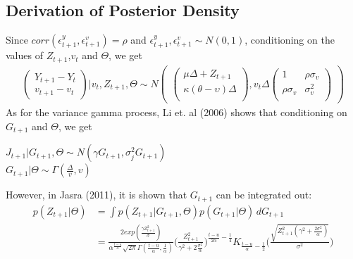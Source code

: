 \documentclass[12pt]{article}
\theoremstyle{definition}
\begin{document}
\subsection{Derivation of Posterior Density}
Since $corr(\epsilon_{t+1}^{y},\epsilon_{t+1}^{v})=\rho$ and $\epsilon_{t+1}^{y},\epsilon_{t+1}^{v} \sim N(0,1)$, conditioning on the values of $Z_{t+1}$,$v_{t}$ and $\Theta$, we get
\begin{equation}
	\begin{aligned}
\begin{pmatrix}
Y_{t+1} - Y_{t}\\
v_{t+1} - v_{t}
\end{pmatrix} | v_{t},Z_{t+1},\Theta
\sim
N
\begin{pmatrix}
\begin{pmatrix}
\mu \Delta + Z_{t+1} \\
\kappa (\theta - \upsilon) \Delta \\
\end{pmatrix}
,
v_{t} \Delta
\begin{pmatrix}
1 & \rho \sigma_{v} \\
\rho \sigma_{v} & \sigma_{v}^2 \\
\end{pmatrix}
\end{pmatrix}
	\end{aligned}
\end{equation}
As for the variance gamma process, Li et. al (2006) shows that conditioning on $G_{t+1}$ and $\Theta$, we get \\
\begin{center}
$J_{t+1} | G_{t+1},\Theta \sim N(\gamma G_{t+1},\sigma_{j}^{2}G_{t+1})$ \\
$G_{t+1} | \Theta \sim \Gamma(\frac{\Delta}{v},v)$\\
\end{center}
However, in Jasra (2011), it is shown that $G_{t+1}$ can be integrated out:
\begin{equation}
	\begin{aligned}
		p(Z_{t+1}|\Theta) &= \int p(Z_{t+1}|G_{t+1},\Theta)p(G_{t+1}|\Theta) \,dG_{t+1}\\
		&= \frac{2exp(\frac{\gamma Z_{t+1}^{2}}{\sigma})}{\alpha^{\frac{t-u}{\alpha}}\sqrt{2\pi} \Gamma(\frac{t-u}{\alpha},\frac{1}{\alpha})}\Bigg(\frac{Z_{t+1}^{2}}{\gamma^{2}+2\frac{\sigma^{2}}{\alpha}}\Bigg)^{\frac{t-u}{2\alpha}-\frac{1}{4}}K_{\frac{t-u}{\alpha}-\frac{1}{2}}\Bigg(\frac{\sqrt{Z_{t+1}^{2}(\gamma^{2}+\frac{2\sigma^{2}}{\alpha})}}{\sigma^{2}}\Bigg)
	\end{aligned}
\end{equation}
\end{document}
